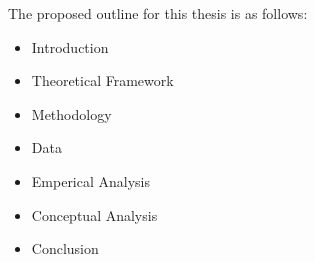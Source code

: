 \noindent The proposed outline for this thesis is as follows:

\begin{itemize}
    \item[-] Introduction
    \item[-] Theoretical Framework
    \item[-] Methodology
    \item[-] Data 
    \item[-] Emperical Analysis
    \item[-] Conceptual Analysis
    \item[-] Conclusion
\end{itemize}